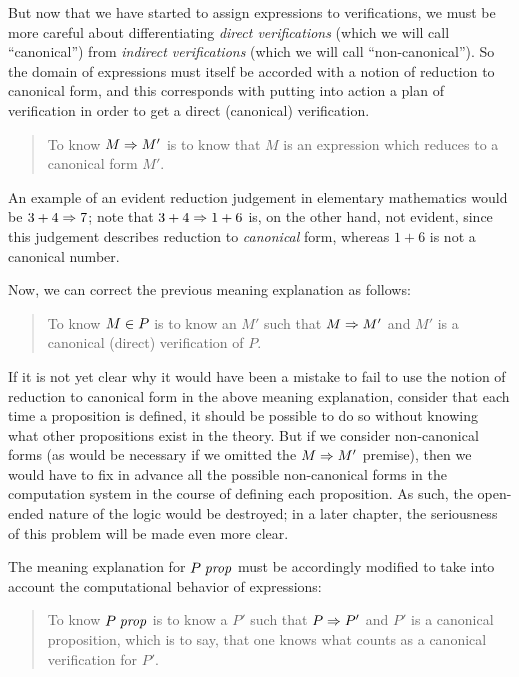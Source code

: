 \documentclass[main.tex]{subfiles}
\begin{document}
But now that we have started to assign expressions to verifications,
we must be more careful about differentiating \emph{direct
verifications} (which we will call ``canonical'') from \emph{indirect
verifications} (which we will call ``non-canonical''). So the domain
of expressions must itself be accorded with a notion of reduction to
canonical form, and this corresponds with putting into action a plan
of verification in order to get a direct (canonical) verification.

\begin{quote}
  To know $M\Rightarrow M'$ is to know that $M$ is an expression which reduces to
  a canonical form $M'$.
\end{quote}

An example of an evident reduction judgement in elementary mathematics
would be $3+4\Rightarrow7$; note that $3+4\Rightarrow1+6$ is, on the
other hand, not evident, since this judgement describes reduction to
\emph{canonical} form, whereas $1+6$ is not a canonical number.

Now, we can correct the previous meaning explanation as follows:

\begin{quote}
  To know $M\in P$ is to know an $M'$ such that $M\Rightarrow M'$ and $M'$ is a
  canonical (direct) verification of $P$.
\end{quote}

If it is not yet clear why it would have been a mistake to fail to use
the notion of reduction to canonical form in the above meaning
explanation, consider that each time a proposition is defined, it
should be possible to do so without knowing what other propositions
exist in the theory. But if we consider non-canonical forms (as would
be necessary if we omitted the $M\Rightarrow M'$ premise), then we
would have to fix in advance all the possible non-canonical forms in
the computation system in the course of defining each proposition. As
such, the open-ended nature of the logic would be destroyed; in a
later chapter, the seriousness of this problem will be made even more
clear.


The meaning explanation for $P\;\mathit{prop}$ must be accordingly modified to take
into account the computational behavior of expressions:

\begin{quote}
  To know $P\;\mathit{prop}$ is to know a $P'$ such that $P\Rightarrow P'$ and $P'$ is a
  canonical proposition, which is to say, that one knows what counts as a
  canonical verification for $P'$.
\end{quote}
\end{document}
